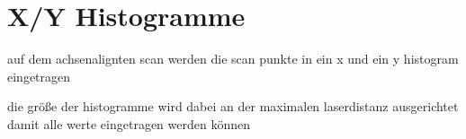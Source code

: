 \section{X/Y Histogramme}

auf dem achsenalignten scan werden die scan punkte in ein x und ein y histogram eingetragen

die größe der histogramme wird dabei an der maximalen laserdistanz ausgerichtet damit alle werte eingetragen werden können